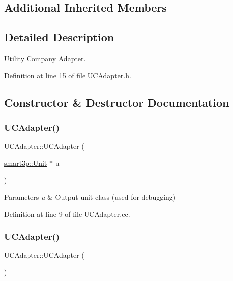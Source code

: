 \subsection*{Additional Inherited Members}


\subsection{Detailed Description}
Utility Company \hyperlink{classAdapter}{Adapter}. 

Definition at line 15 of file U\+C\+Adapter.\+h.



\subsection{Constructor \& Destructor Documentation}
\mbox{\label{classUCAdapter_ad845819dddba8f4dd674425ff320d99b}} 
\subsubsection{\texorpdfstring{U\+C\+Adapter()}{UCAdapter()}\hspace{0.1cm}{\footnotesize\ttfamily [1/2]}}
{\footnotesize\ttfamily U\+C\+Adapter\+::\+U\+C\+Adapter (\begin{DoxyParamCaption}\item[{\hyperlink{classsmart3p_1_1Unit}{smart3p\+::\+Unit} $\ast$}]{u }\end{DoxyParamCaption})}


\begin{DoxyParams}{Parameters}
{\em u} & Output unit class (used for debugging) \\
\hline
\end{DoxyParams}


Definition at line 9 of file U\+C\+Adapter.\+cc.

\mbox{\label{classUCAdapter_a15c10a1542ab5729b6663c342a71e217}} 
\subsubsection{\texorpdfstring{U\+C\+Adapter()}{UCAdapter()}\hspace{0.1cm}{\footnotesize\ttfamily [2/2]}}
{\footnotesize\ttfamily U\+C\+Adapter\+::\+U\+C\+Adapter (\begin{DoxyParamCaption}{ }\end{DoxyParamCaption})}




